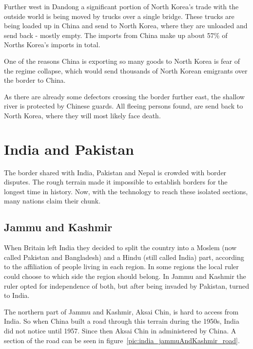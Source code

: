 \documentclass[conference]{IEEEtran}
\begin{document}
	Further west in Dandong a significant portion of North Korea's trade with the outside world is being moved by trucks over a single bridge. These trucks are being loaded up in China and send to North Korea, where they are unloaded and send back - mostly empty. The imports from China make up about 57\%\cite{wp_economyOfNorthKorea} of Norths Korea's imports in total.
	
	One of the reasons China is exporting so many goods to North Korea is fear of the regime collapse, which would send thousands of North Korean emigrants over the border to China.
	
	As there are already some defectors crossing the border further east, the shallow river is protected by Chinese guards.\cite{yp_anInconvenientBorderWhereChinaMeetsNorthKoreaABCNews} All fleeing persons found, are send back to North Korea, where they will most likely face death.
	
	\section{India and Pakistan}
	The border shared with India, Pakistan and Nepal is crowded with border disputes. The rough terrain made it impossible to establish borders for the longest time in history. Now, with the technology to reach these isolated sections, many nations claim their chunk.
	
	\subsection{Jammu and Kashmir}
	When Britain left India they decided to split the country into a Moslem (now called Pakistan and Bangladesh) and a Hindu (still called India) part, according to the affiliation of people living in each region. In some regions the local ruler could choose to which side the region should belong. In Jammu and Kashmir the ruler opted for independence of both, but after being invaded by Pakistan, turned to India.
	
	The northern part of Jammu and Kashmir, Aksai Chin, is hard to access from India. So when China built a road through this terrain during the 1950s, India did not notice until 1957. Since then Aksai Chin in administered by China. A section of the road can be seen in figure~\ref{pic:india_jammuAndKashmir_road}.
	
\end{document}
